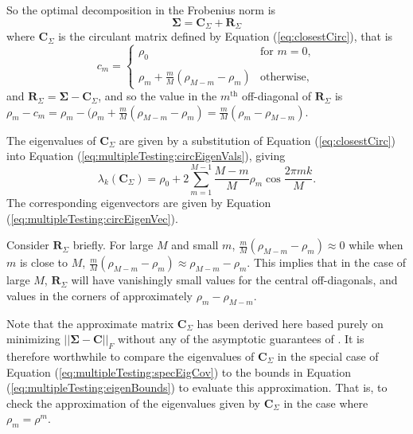 \documentclass[letterpaper,12pt,oneside,final]{article}
\newcommand{\m}[1]{\mathbf{#1}}               %
\newcommand{\sm}[1]{\boldsymbol{#1}}   %
\newcommand{\norm}[1]{||{#1}||}              %
\newcommand{\frob}[1]{\norm{#1}_F}
\begin{document}
So the optimal decomposition in the Frobenius norm is
\begin{equation} \label{eq:sigmaCirculantDecomp}
  \sm{\Sigma} = \m{C}_{\Sigma} + \m{R}_{\Sigma}
\end{equation}
where $\m{C}_{\Sigma}$ is the circulant matrix defined by Equation (\ref{eq:closestCirc}), that is
\begin{equation*}
  c_m = \begin{cases}
    \rho_0 & \text{for } m = 0, \\
    & \\
    \rho_m + \frac{m}{M}(\rho_{M-m} - \rho_m) & \text{otherwise},
  \end{cases}
\end{equation*}
and $\m{R}_{\Sigma} = \sm{\Sigma} - \m{C}_{\Sigma}$, and so the value in the $m^{\text{th}}$ off-diagonal of $\m{R}_{\Sigma}$ is $\rho_m - c_m = \rho_m - (\rho_m + \frac{m}{M}(\rho_{M-m} - \rho_m) = \frac{m}{M} (\rho_m - \rho_{M-m}).$

The eigenvalues of $\m{C}_{\Sigma}$ are given by a substitution of Equation (\ref{eq:closestCirc}) into Equation (\ref{eq:multipleTesting:circEigenVals}), giving
\begin{equation} \label{eq:multipleTesting:circApproxEig}
  \lambda_k (\m{C}_{\Sigma}) = \rho_0 + 2 \sum_{m = 1}^{M-1} \frac{M - m}{M} \rho_m \cos \frac{2 \pi mk}{M}.
\end{equation}
The corresponding eigenvectors are given by Equation (\ref{eq:multipleTesting:circEigenVec}).

Consider $\m{R}_{\Sigma}$ briefly. For large $M$ and small $m$, $\frac{m}{M} (\rho_{M-m} - \rho_m) \approx 0$ while when $m$ is close to $M$, $\frac{m}{M} (\rho_{M-m} - \rho_m) \approx \rho_{M-m} - \rho_m$. This implies that in the case of large $M$, $\m{R}_{\Sigma}$ will have vanishingly small values for the central off-diagonals, and values in the corners of approximately $\rho_m - \rho_{M-m}$.

Note that the approximate matrix $\m{C}_{\Sigma}$ has been derived here based purely on minimizing $\frob{\sm{\Sigma} - \m{C}}$ without any of the asymptotic guarantees of \cite{grenanderszego1958}. It is therefore worthwhile to compare the eigenvalues of $\m{C}_{\Sigma}$ in the special case of Equation (\ref{eq:multipleTesting:specEigCov}) to the bounds in Equation (\ref{eq:multipleTesting:eigenBounds}) to evaluate this approximation. That is, to check the approximation of the eigenvalues given by $\m{C}_{\Sigma}$ in the case where $\rho_{m} = \rho^m$.
\end{document}
